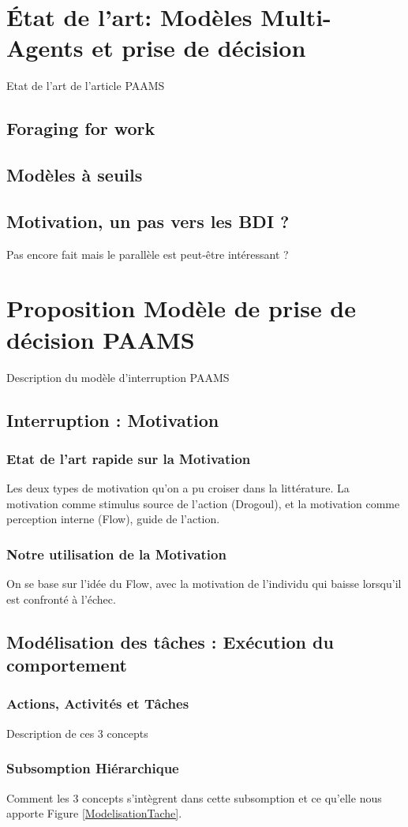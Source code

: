\documentclass[10pt,a4paper]{article}
\begin{document}
\section{État de l'art: Modèles Multi-Agents et prise de décision}
	Etat de l'art de l'article PAAMS
	\subsection{Foraging for work}
	\subsection{Modèles à seuils}
	\subsection{Motivation, un pas vers les BDI ?}
		Pas encore fait mais le parallèle est peut-être intéressant ?
\section{Proposition Modèle de prise de décision PAAMS}
	Description du modèle d'interruption PAAMS	
	\subsection{Interruption : Motivation}
		\subsubsection{Etat de l'art rapide sur la Motivation}
			Les deux types de motivation qu'on a pu croiser dans la littérature. La motivation comme stimulus source de l'action (Drogoul), et la motivation comme perception interne (Flow), guide de l'action.
		\subsubsection{Notre utilisation de la Motivation}
			On se base sur l'idée du Flow, avec la motivation de l'individu qui baisse lorsqu'il est confronté à l'échec.
	\subsection{Modélisation des tâches : Exécution du comportement}
		\subsubsection{Actions, Activités et Tâches}
			Description de ces 3 concepts
		\subsubsection{Subsomption Hiérarchique}
			Comment les 3 concepts s'intègrent dans cette subsomption et ce qu'elle nous apporte Figure \ref{ModelisationTache}.
			
\end{document}
